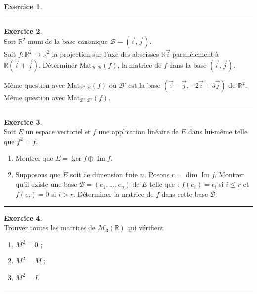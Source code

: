 \documentclass[a4paper,10pt]{article}
\theoremstyle{definition}
\theoremstyle{definition}
\newtheorem{exo}{Exercice}
\newcommand{\R}{\mathbb{R}}
\renewcommand{\Im}{\mathop{\mathrm{Im}}\nolimits}
\begin{document}
\begin{minipage}{1\linewidth}
\begin{minipage}[t]{0.48\linewidth}
\begin{exo}
		\centering
		\rule{1\linewidth}{0.6pt}
	\end{exo}
	
	
	
	\begin{exo}\quad\\
		Soit $\R^2$ muni de la base canonique $\mathcal{B}=(\vec{i}, \vec{j})$.\\
		Soit $f : \R^2 \to \R^2$ la projection sur l'axe des abscisses $\R \vec{i}$ 
		parall\`element à $\R (\vec{i} + \vec{j})$.
		Déterminer $\textrm{Mat}_{\mathcal{B},\mathcal{B}}(f)$, la matrice de $f$ dans la base $(\vec{i}, \vec{j})$.
		
		Même question avec $\textrm{Mat}_{\mathcal{B}',\mathcal{B}}(f)$ où $\mathcal{B'}$ est la base 
		$(\vec{i} - \vec{j}, -2\vec{i}+3\vec{j})$ de $\R^2$.
		Même question avec $\textrm{Mat}_{\mathcal{B}',\mathcal{B}'}(f)$.	
		
		\centering
		\rule{1\linewidth}{0.6pt}
	\end{exo}
	
\begin{exo}\quad\\
	Soit  $E$  un espace vectoriel et  $f$  une application linéaire de
	$E$  dans  lui-m\^eme telle que  $f^2=f$.
	\begin{enumerate}
		\item Montrer que  $E= \ker f \oplus \Im f$.
		
		\item Supposons que  $E$ soit de dimension finie  $n$. 
		Posons  $r= \dim \Im f$. 
		Montrer qu'il existe une base 
		$\mathcal{B}= ( e_1, \ldots ,e_n)$ de  $E$  telle que : 
		$f(e_i)=e_i$ si $i\le r$ et $f(e_i)=0$ si $i>r$. 
		Déterminer la matrice de  $f$ dans cette base $\mathcal{B}$.
	\end{enumerate}
	
	\centering
	\rule{1\linewidth}{0.6pt}
\end{exo}
		
		\begin{exo}\quad\\
			Trouver toutes les matrices de $\mathcal{M}_3(\R)$ qui vérifient
			\begin{enumerate}
				\item $M^2 = 0$ ;
				\item $M^2 = M$ ; 
				\item $M^2 = I$. 
			\end{enumerate}
			
			\centering
			\rule{1\linewidth}{0.6pt}
		\end{exo}

		
		
		
	\end{minipage}
\end{minipage}
\newpage
\end{document}
